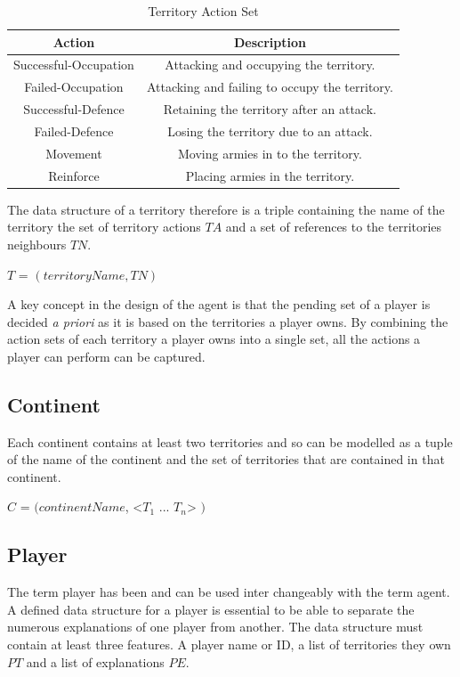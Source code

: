 \documentclass[parskip]{cs4rep}
\begin{document}
\begin{table}[ht]
\centering
\begin{tabular}{|c|c|}
\hline 
\textbf{Action} & \textbf{Description} \\ 
\hline 
Successful-Occupation & Attacking and occupying the territory.\\ 
\hline 
Failed-Occupation & Attacking and failing to occupy the territory.\\ 
\hline 
Successful-Defence & Retaining the territory after an attack.\\ 
\hline 
Failed-Defence & Losing the territory due to an attack.\\
\hline
Movement & Moving armies in to the territory.\\
\hline  
Reinforce & Placing armies in the territory.\\
\hline 
\end{tabular}
\caption{Territory Action Set}
\label{table:territory-actions-bonus}
\end{table}

\newpage

The data structure of a territory therefore is a triple containing the name of the territory the set of territory actions $TA$ and a set of references to the territories neighbours $TN$.

\centerline{
$T$ = $( territoryName, TN )$
}

A key concept in the design of the agent is that the pending set of a player is decided \textit{a priori} as it is based on the territories a player owns. By combining the action sets of each territory a player owns into a single set, all the actions a player can perform can be captured.

\subsection{Continent}

Each continent contains at least two territories and so can be modelled as a tuple of the name of the continent and the set of territories that are contained in that continent.

\centerline{
$C$ = $( continentName$, <$T_{1}$ ... $T_{n}$> $)$
}

\subsection{Player}

The term player has been and can be used inter changeably with the term agent. A defined data structure for a player is essential to be able to separate the numerous explanations of one player from another. The data structure must contain at least three features. A player name or ID, a list of territories they own $PT$ and a list of explanations $PE$.\newline
\end{document}
